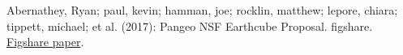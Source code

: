 \documentclass{article}
\begin{document}
\vfill
\pagebreak






\small

\begin{thebibliography}{00}
 Abernathey, Ryan; paul, kevin; hamman, joe; rocklin, matthew; lepore, chiara; tippett, michael; et al. (2017): Pangeo NSF Earthcube Proposal. figshare. \href{https://figshare.com/articles/Pangeo_NSF_Earthcube_Proposal/5361094}{Figshare paper}. 
\end{thebibliography}
\end{document}
